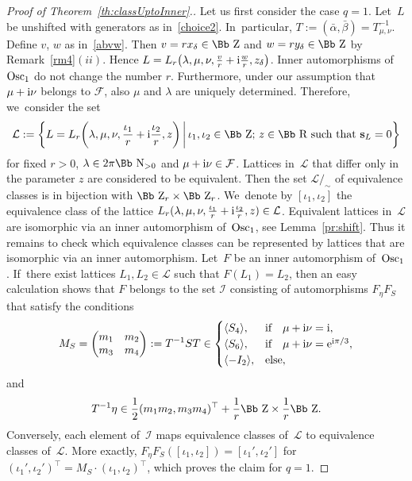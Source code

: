 \documentclass[10pt,a4paper]{amsart}
\newcommand\RR{{\mbox{\Bb R}}}
\newcommand\NN{{\mbox{\Bb N}}}
\newcommand\ZZ{{\mbox{\Bb Z}}}
\newcommand\bs{\textbf{{\rm \textbf{s}}}}
\newcommand\cF{{\mathcal F}}
\newcommand{\Osc}{{\rm Osc}}
\newcommand\la{\langle}
\newcommand\ra{\rangle}
\numberwithin{equation}{section}
\begin{document}
\begin{proof}[Proof of Theorem~\ref{th:classUptoInner}.]
Let us first consider the case $q=1$. Let~$L$ be unshifted with generators as in~\eqref{choice2}. In~particular, $T:=(\bar \alpha,\bar\beta)=T_{\mu,\nu}^{-1}$. Define $v$, $w$ as in~\eqref{abvw}. Then $v=rx_\delta\in\ZZ$ and $w=ry_\delta\in\ZZ$ by Remark~\ref{rm4}$(ii)$. Hence $L=L_r\big(\lambda,\mu,\nu,\frac vr+{\rm i}\frac wr,z_\delta\big)$. Inner automorphisms of~$\Osc_1$ do not change the number $r$. Furthermore, under our assumption that $\mu+{\rm i}\nu$ belongs to $\cF$, also $\mu$ and $\lambda$ are uniquely determined. Therefore, we~consider the set
\begin{gather*}
{\mathcal L}:=\bigg\{L=L_r\bigg(\lambda,\mu,\nu,\frac {\iota_1}r+{\rm i}\frac {\iota_2}r,z\bigg)\,\bigg|\, \iota_1,\iota_2\in\ZZ;\, z\in\RR \text{ such that } \bs_L=0\bigg\}
\end{gather*}
for fixed $r>0$, $\lambda\in 2\pi\NN_{>0}$ and $\mu+{\rm i}\nu\in\cF$. Lattices in~$\mathcal L$ that differ only in the parameter $z$ are considered to be equivalent. Then the set ${\mathcal L}/_{\sim}$ of equivalence classes is in bijection with $\ZZ_r\times\ZZ_r$. We~denote by $[\iota_1,\iota_2]$ the equivalence class of the lattice $L_r(\lambda,\mu,\nu,\frac {\iota_1}r+{\rm i}\frac {\iota_2}r,z)\in {\mathcal L}$. Equivalent lattices in~${\mathcal L}$ are isomorphic via an inner automorphism of~$\Osc_1$, see Lemma~\ref{pr:shift}. Thus it remains to check which equivalence classes can be represented by lattices that are isomorphic via an inner automorphism. Let~$F$ be an inner automorphism of~$\Osc_1$. If~there exist lattices $L_1,L_2\in{\mathcal L}$ such that $F(L_1)=L_2$, then an easy calculation shows that $F$ belongs to the set
${\mathcal I}$ consisting of automorphisms $F_\eta F_S$ that satisfy the conditions
\begin{gather*}
M_S= \begin{pmatrix}m_1&m_2\\m_3&m_4\end{pmatrix}:=T^{-1}ST\in
\begin{cases}
\la S_4 \ra, & \text{if}\quad\mu+{\rm i}\nu={\rm i},\\
\la S_6 \ra, & \text{if}\quad \mu+{\rm i}\nu={\rm e}^{{\rm i}\pi/3},\\
\la -I_2 \ra, & \text{else},
\end{cases}
\end{gather*}
and
\begin{gather*}
T^{-1} \eta\in {\frac12} (m_1 m_2, m_3 m_4)^\top + \frac1r\ZZ\times\frac1r \ZZ.
\end{gather*}
Conversely, each element of~${\mathcal I}$ maps equivalence classes of~${\mathcal L}$ to equivalence classes of~${\mathcal L}$. More exactly, $F_\eta F_S([\iota_1,\iota_2])= [\iota_1',\iota_2']$ for $(\iota_1',\iota_2')^\top= M_S\cdot (\iota_1,\iota_2)^\top$, which proves the claim for $q=1$.


\end{proof}
\end{document}
